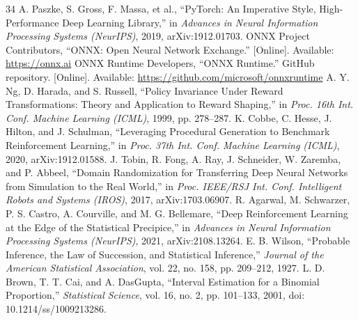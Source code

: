 \documentclass[conference]{IEEEtran}
\begin{document}
\begin{thebibliography}{34}
A. Paszke, S. Gross, F. Massa, et al., ``{PyTorch}: An Imperative Style, High-Performance Deep Learning Library,'' in \textit{Advances in Neural Information Processing Systems (NeurIPS)}, 2019, arXiv:1912.01703.
ONNX Project Contributors, ``{ONNX}: Open Neural Network Exchange.'' [Online]. Available: \url{https://onnx.ai}
ONNX Runtime Developers, ``{ONNX Runtime}.'' GitHub repository. [Online]. Available: \url{https://github.com/microsoft/onnxruntime}
A. Y. Ng, D. Harada, and S. Russell, ``Policy Invariance Under Reward Transformations: Theory and Application to Reward Shaping,'' in \textit{Proc. 16th Int. Conf. Machine Learning (ICML)}, 1999, pp. 278--287.
K. Cobbe, C. Hesse, J. Hilton, and J. Schulman, ``Leveraging Procedural Generation to Benchmark Reinforcement Learning,'' in \textit{Proc. 37th Int. Conf. Machine Learning (ICML)}, 2020, arXiv:1912.01588.
J. Tobin, R. Fong, A. Ray, J. Schneider, W. Zaremba, and P. Abbeel, ``Domain Randomization for Transferring Deep Neural Networks from Simulation to the Real World,'' in \textit{Proc. IEEE/RSJ Int. Conf. Intelligent Robots and Systems (IROS)}, 2017, arXiv:1703.06907.
R. Agarwal, M. Schwarzer, P. S. Castro, A. Courville, and M. G. Bellemare, ``Deep Reinforcement Learning at the Edge of the Statistical Precipice,'' in \textit{Advances in Neural Information Processing Systems (NeurIPS)}, 2021, arXiv:2108.13264.
E. B. Wilson, ``Probable Inference, the Law of Succession, and Statistical Inference,'' \textit{Journal of the American Statistical Association}, vol. 22, no. 158, pp. 209--212, 1927.
L. D. Brown, T. T. Cai, and A. DasGupta, ``Interval Estimation for a Binomial Proportion,'' \textit{Statistical Science}, vol. 16, no. 2, pp. 101--133, 2001, doi: 10.1214/ss/1009213286.
\end{thebibliography}
\end{document}
